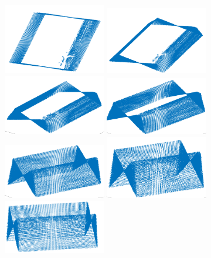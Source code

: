 \begin{figure}
  \centering \footnotesize
  \includegraphics[width=0.40\textwidth]{images/caja3D_1.png}
  \includegraphics[width=0.40\textwidth]{images/caja3D_2.png}
  \includegraphics[width=0.40\textwidth]{images/caja3D_3.png}
  \includegraphics[width=0.40\textwidth]{images/caja3D_4.png}
  \includegraphics[width=0.40\textwidth]{images/caja3D_5.png}
  \includegraphics[width=0.40\textwidth]{images/caja3D_6.png}
  \includegraphics[width=0.40\textwidth]{images/caja3D_7.png}

\end{figure}
